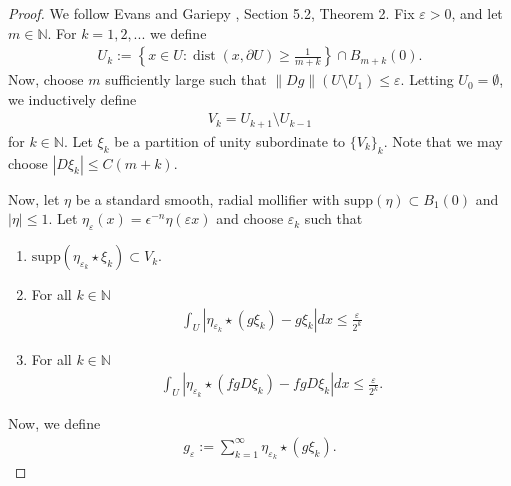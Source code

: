 \documentclass[12pt]{amsart}
\numberwithin{equation}{section}
\theoremstyle{plain}
\theoremstyle{definition}
\newcommand{\norm}[1]{\left\lVert#1\right\rVert}
\newcommand{\dist}{\mathop\mathrm{dist}\nolimits}
\begin{document}
\begin{proof}
    We follow Evans and Gariepy \cite{evansgariepy}, Section 5.2, Theorem 2.  Fix $\varepsilon>0$, and let $m \in \mathbb{N}$.  For $k = 1, 2, ...$ we define 
    \begin{align*}
        U_k:= \left\{x \in U: \dist(x, \partial U) \ge \frac{1}{m+k} \right\} \cap B_{m+k}(0).
    \end{align*}
Now, choose $m$ sufficiently large such that $\norm{Dg}(U \setminus U_1) \le \varepsilon$.  Letting $U_0 = \emptyset$, we inductively define 
\begin{align*}
    V_k = U_{k+1} \setminus U_{k-1}
\end{align*}
for $k \in \mathbb{N}$. Let $\xi_k$ be a partition of unity subordinate to $\{V_k\}_k$. Note that we may choose $|D\xi_k| \le C(m+k)$.  

Now, let $\eta$ be a standard smooth, radial mollifier with $\text{supp}(\eta) \subset B_1(0)$ and $|\eta|\le 1$.  Let $\eta_\varepsilon(x) = \epsilon^{-n}\eta(\varepsilon x)$ and choose $\varepsilon_k$ such that 
\begin{enumerate}
    \item $\text{supp}(\eta_{\varepsilon_k} \star \xi_k) \subset V_k$.
    \item For all $k \in \mathbb{N}$ 
    \begin{align}\label{e: POU 2}
    \int_U |\eta_{\varepsilon_k} \star (g\xi_k) - g\xi_k|dx \le \frac{\varepsilon}{2^k}
\end{align}
\item For all $k \in \mathbb{N}$ 
    \begin{align}\label{e:POU 3}
    \int_U |\eta_{\varepsilon_k} \star (fgD\xi_k) - fgD\xi_k|dx \le \frac{\varepsilon}{2^k}.
\end{align} 
\end{enumerate}
Now, we define
\begin{align}
    g_\varepsilon := \sum_{k=1}^{\infty}\eta_{\varepsilon_k}\star (g \xi_k).
\end{align}


\end{proof}
\end{document}
